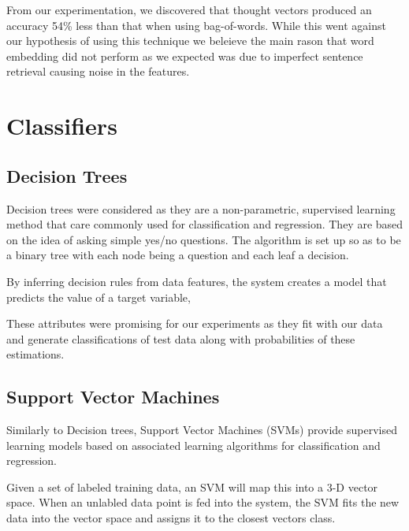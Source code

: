 \documentclass[bsc,frontabs,twoside,singlespacing,parskip,deptreport]{infthesis}     %
\begin{document}


From our experimentation, we discovered that thought vectors produced an accuracy 54\% less than that when
using bag-of-words. While this went against our hypothesis of using this technique we beleieve
the main rason that word embedding did not perform as we expected was due to imperfect sentence retrieval causing noise in
the features.

\section{Classifiers}\label{sec:classifiers}
\subsection{Decision Trees}
Decision trees were considered as they are a non-parametric, supervised learning method that care commonly used for
classification and regression.
They are based on the idea of asking simple yes/no questions. The algorithm is set up so as to be a binary tree with
each node being a question and each leaf a decision.

By inferring decision rules from data features, the system creates a model that predicts the value of a target variable,

These attributes were promising for our experiments as they fit with our data and generate
classifications of test data along with probabilities of these estimations.


\subsection{Support Vector Machines}
Similarly to Decision trees, Support Vector Machines (SVMs) provide supervised learning models based on
associated learning algorithms for classification and regression.

Given a set of labeled training data, an SVM will map this into a 3-D vector space.
When an unlabled data point is fed into the system, the SVM fits the new data into the vector space and
assigns  it to the closest vectors class.
\end{document}
